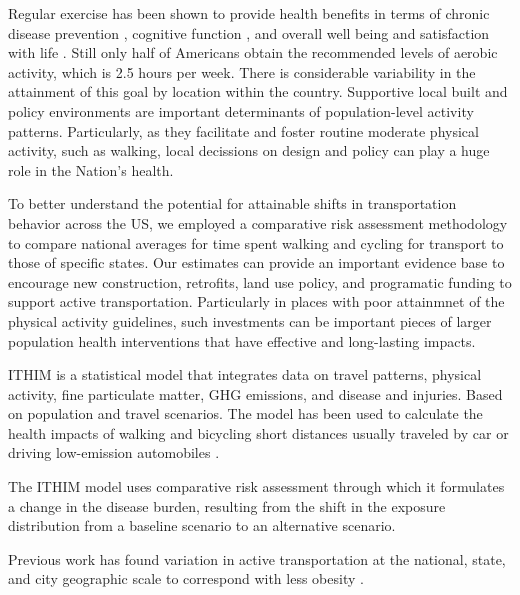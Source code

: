 Regular exercise has been shown to provide health benefits in terms of
chronic disease prevention \cite{warburton2006}, cognitive function
\cite{hillman2008}, and overall well being and satisfaction with life
\cite{maher2013}. Still only half of Americans obtain the recommended
levels of aerobic activity, which is 2.5 hours per week. There is
considerable variability in the attainment of this goal by location
within the country. Supportive local built and policy environments are
important determinants of population-level activity
patterns. Particularly, as they facilitate and foster routine moderate
physical activity, such as walking, local decissions on design and
policy can play a huge role in the Nation's health.

To better understand the potential for attainable shifts in
transportation behavior across the US, we employed a comparative risk
assessment methodology to compare national averages for time spent
walking and cycling for transport to those of specific states. Our
estimates can provide an important evidence base to encourage new
construction, retrofits, land use policy, and programatic funding to
support active transportation. Particularly in places with poor
attainmnet of the physical activity guidelines, such investments can
be important pieces of larger population health interventions that
have effective and long-lasting impacts.

ITHIM is a statistical model that integrates data on travel patterns,
physical activity, fine particulate matter, GHG emissions, and disease
and injuries. Based on population and travel scenarios. The model has
been used to calculate the health impacts of walking and bicycling
short distances usually traveled by car or driving low-emission
automobiles \cite{woodcock2013,maizlish2013}.

The ITHIM model uses comparative risk assessment through which it
formulates a change in the disease burden, resulting from the shift in
the exposure distribution from a baseline scenario to an alternative
scenario.

Previous work has found variation in active transportation at the national, state, and city geographic scale to correspond with less obesity \cite{pucher2010}. 
